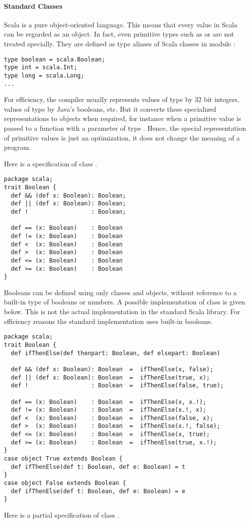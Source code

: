 \paragraph{Standard Classes}


Scala is a pure object-oriented language. This means that every value
in Scala can be regarded as an object.  In fact, even primitive types
such as  or  are not treated specially. They
are defined as type aliases of Scala classes in module :
\begin{lstlisting}
type boolean = scala.Boolean;
type int = scala.Int;
type long = scala.Long;
...
\end{lstlisting}
For efficiency, the compiler usually represents values of type
 by 32 bit integers, values of type
 by Java's booleans, etc.  But it converts these
specialized representations to objects when required, for instance
when a primitive  value is passed to a function with a
parameter of type .  Hence, the special representation of
primitive values is just an optimization, it does not change the
meaning of a program.

Here is a specification of class .
\begin{lstlisting}
package scala;
trait Boolean {
  def && (def x: Boolean): Boolean;
  def || (def x: Boolean): Boolean;
  def !                  : Boolean;

  def == (x: Boolean)    : Boolean
  def != (x: Boolean)    : Boolean
  def <  (x: Boolean)    : Boolean
  def >  (x: Boolean)    : Boolean
  def <= (x: Boolean)    : Boolean
  def >= (x: Boolean)    : Boolean
}
\end{lstlisting}
Booleans can be defined using only classes and objects, without
reference to a built-in type of booleans or numbers. A possible
implementation of class  is given below.  This is not
the actual implementation in the standard Scala library. For
efficiency reasons the standard implementation uses built-in
booleans.
\begin{lstlisting}
package scala;
trait Boolean {
  def ifThenElse(def thenpart: Boolean, def elsepart: Boolean)

  def && (def x: Boolean): Boolean  =  ifThenElse(x, false);
  def || (def x: Boolean): Boolean  =  ifThenElse(true, x);
  def !                  : Boolean  =  ifThenElse(false, true);

  def == (x: Boolean)    : Boolean  =  ifThenElse(x, x.!);
  def != (x: Boolean)    : Boolean  =  ifThenElse(x.!, x);
  def <  (x: Boolean)    : Boolean  =  ifThenElse(false, x);
  def >  (x: Boolean)    : Boolean  =  ifThenElse(x.!, false);
  def <= (x: Boolean)    : Boolean  =  ifThenElse(x, true);
  def >= (x: Boolean)    : Boolean  =  ifThenElse(true, x.!);
}
case object True extends Boolean {
  def ifThenElse(def t: Boolean, def e: Boolean) = t
}
case object False extends Boolean {
  def ifThenElse(def t: Boolean, def e: Boolean) = e
}
\end{lstlisting}
Here is a partial specification of class .

